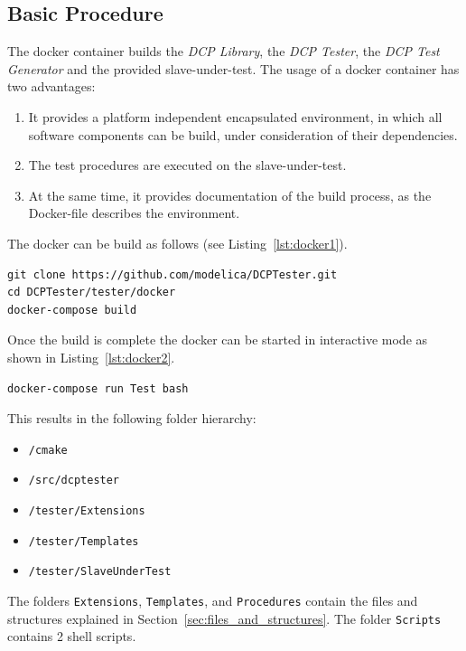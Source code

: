 \documentclass[a4paper]{scrartcl}
\theoremstyle{definition}
\begin{document}
\subsection{Basic Procedure}
\label{sec:basic_procedure}
The docker container builds the \textit{DCP Library}, the \textit{DCP Tester}, the \textit{DCP Test Generator} and the provided slave-under-test.
The usage of a docker container has two advantages:
\begin{enumerate}
\item It provides a platform independent encapsulated environment, in which all software components can be build, under consideration of their dependencies.
\item The test procedures are executed on the slave-under-test.
\item At the same time, it provides documentation of the build process, as the Docker-file describes the environment.
\end{enumerate}
The docker can be build as follows (see Listing~\ref{lst:docker1}).

\lstset{language=bash, numbers=left, numberstyle=\tiny, numbersep=10pt, frame=lines, captionpos=t, aboveskip=10pt, belowskip=10pt}
\begin{lstlisting}[caption=Building the Docker container, label=lst:docker1]
git clone https://github.com/modelica/DCPTester.git
cd DCPTester/tester/docker
docker-compose build
\end{lstlisting}

Once the build is complete the docker can be started in interactive mode as shown in Listing~\ref{lst:docker2}.
\begin{lstlisting}[caption=Building the Docker container, label=lst:docker2]
docker-compose run Test bash
\end{lstlisting}

This results in the following folder hierarchy:
\begin{itemize}
	\item \texttt{/cmake}
	\item \texttt{/src/dcptester}
	\item \texttt{/tester/Extensions}
	\item \texttt{/tester/Templates}
	\item \texttt{/tester/SlaveUnderTest}
\end{itemize}

The folders \texttt{Extensions}, \texttt{Templates}, and \texttt{Procedures} contain the files and structures explained in Section~\ref{sec:files_and_structures}.
The folder \texttt{Scripts} contains 2 shell scripts.
\end{document}
